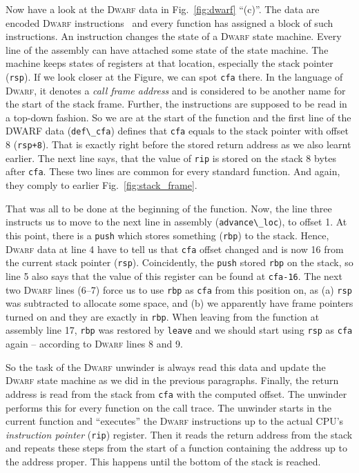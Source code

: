 \documentclass[10pt]{llncs}
\newcommand{\code}[2][]{\lstinline[columns=fullflexible, #1]$#2$}
\newcommand{\codeasm}[2][]{\code[language={[x86masm]Assembler},
	morekeywords={rbp,rsp},#1]{#2}}
\newcommand{\dwarf}{\textsc{Dwarf}\xspace}
\begin{document}
Now have a look at the \dwarf data in Fig.~\ref{fig:dwarf} ``(c)''. The data are
encoded \dwarf instructions~\cite{dwarf_insn} and every function has assigned
a block of such instructions. An instruction changes the state of a \dwarf
state machine.  Every line of the assembly can have attached some state of the
state machine.  The machine keeps states of registers at that location,
especially the stack pointer (\codeasm{rsp}). If we look closer at the Figure,
we can spot \code{cfa} there. In the language of \dwarf, it denotes a
\emph{call frame address} and is considered to be another name for the start
of the stack frame. Further, the instructions are supposed to be read in a
top-down fashion.  So we are at the start of the function and the first line
of the DWARF data (\code{def\_cfa}) defines that \code{cfa} equals to the
stack pointer with offset 8 (\codeasm{rsp+8}).  That is exactly right before
the stored return address as we also learnt earlier.  The next line says, that
the value of \codeasm{rip} is stored on the stack 8 bytes after \code{cfa}.
These two lines are common for every standard function. And again, they comply
to earlier Fig.~\ref{fig:stack_frame}.

That was all to be done at the beginning of the function. Now, the line three
instructs us to move to the next line in assembly (\code{advance\_loc}), to
offset 1. At this point, there is a \codeasm{push} which stores something
(\codeasm{rbp}) to the stack. Hence, \dwarf data at line 4 have to tell us
that \code{cfa} offset changed and is now 16 from the current stack pointer
(\codeasm{rsp}).  Coincidently, the \codeasm{push} stored \codeasm{rbp} on the
stack, so line 5 also says that the value of this register can be found at
\code{cfa-16}. The next two \dwarf lines (6--7) force us to use \codeasm{rbp}
as \code{cfa} from this position on, as (a) \code{rsp} was subtracted to
allocate some space, and (b) we apparently have frame pointers turned on and
they are exactly in \codeasm{rbp}. When leaving from the function at assembly
line 17, \codeasm{rbp} was restored by \codeasm{leave} and we should start
using \codeasm{rsp} as \code{cfa} again -- according to \dwarf lines 8 and 9.

So the task of the \dwarf unwinder is always read this data and update the
\dwarf state machine as we did in the previous paragraphs. Finally, the return
address is read from the stack from \code{cfa} with the computed offset. The
unwinder performs this for every function on the call trace. The unwinder
starts in the current function and ``executes'' the \dwarf instructions up to
the actual CPU's \textit{instruction pointer} (\code{rip}) register. Then it
reads the return address from the stack and repeats these steps from the start
of a function containing the address up to the address proper. This happens
until the bottom of the stack is reached.
\end{document}
